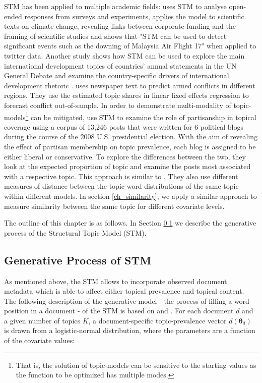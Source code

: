 \documentclass[12pt,a4paper,notitlepage]{article}
\begin{document}
STM has been applied to multiple academic fields: \citet{roberts_structural_2014} uses STM to analyse open-ended responses from surveys and experiments, \citet{farrell_corporate_2016} applies the model to scientific texts on climate change, revealing links between corporate funding and the framing of scientific studies and \citet{mishler_using_2015} shows that "STM can be used to detect significant events such as the downing of Malaysia Air Flight 17" when applied to twitter data. Another study shows how STM can be used to explore the main international development topics of countries’ annual statements in the UN General Debate and examine the country-specific drivers of international development rhetoric \citep{baturo_what_2017}. \citet{mueller_reading_2016} uses newspaper text to predict armed conflicts in different regions. They use the estimated topic shares in linear fixed effects regression to forecast conflict out-of-sample. In order to demonstrate multi-modality of topic-models\footnote{That is, the solution of topic-models can be sensitive to the starting values as the function to be optimized has multiple modes.} can be mitigated, \citep{roberts_navigating_2016} use STM to examine the role of partisanship in topical coverage using a corpus of 13,246 posts that were written for 6 political blogs during the course of the 2008 U.S. presidential election. With the aim of revealing the effect of partisan membership on topic prevalence, each blog is assigned to be either liberal or conservative. To explore the differences between the two, they look at the expected proportion of topic and examine the posts most associated with a respective topic. This approach is similar to \citet{roberts_model_2016}. They also use different measures of distance between the topic-word distributions of the same topic within different models. In section \ref{ch_similarity}, we apply a similar approach to measure similarity between the same topic for different covariate levels.

The outline of this chapter is as follows. In Section \ref{ch_generativeProcess} we describe the generative process of the Structural Topic Model (STM). 

\subsection{Generative Process of STM}\label{ch_generativeProcess}

As mentioned above, the STM allows to incorporate observed document metadata which is able to affect either topical prevalence and topical content. The following description of the generative model - the process of filling a word-position in a document - of the STM is based on \citet{roberts_structural_2013} and \citet{roberts_stm:_2016}. For each document $d$ and a given number of topics $K$, a document-specific topic-prevalence vector $d(\boldsymbol{\theta}_d)$ is drawn from a logistic-normal distribution, where the parameters are a function of the covariate values:
\end{document}
